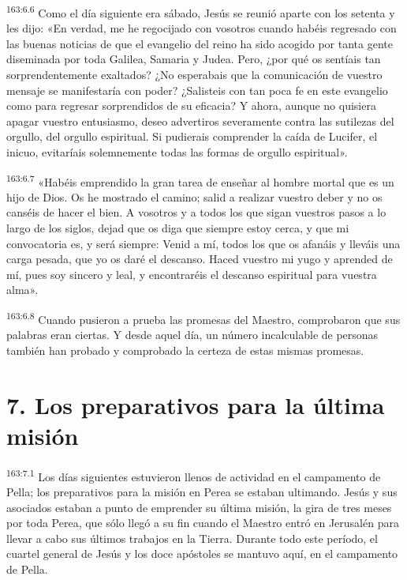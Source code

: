 \par 
\textsuperscript{163:6.6} Como el día siguiente era sábado, Jesús se reunió aparte con los setenta y les dijo: «En verdad, me he regocijado con vosotros cuando habéis regresado con las buenas noticias de que el evangelio del reino ha sido acogido por tanta gente diseminada por toda Galilea, Samaria y Judea. Pero, ¿por qué os sentíais tan sorprendentemente exaltados? ¿No esperabais que la comunicación de vuestro mensaje se manifestaría con poder? ¿Salisteis con tan poca fe en este evangelio como para regresar sorprendidos de su eficacia? Y ahora, aunque no quisiera apagar vuestro entusiasmo, deseo advertiros severamente contra las sutilezas del orgullo, del orgullo espiritual. Si pudierais comprender la caída de Lucifer, el inicuo, evitaríais solemnemente todas las formas de orgullo espiritual».

\par 
\textsuperscript{163:6.7} «Habéis emprendido la gran tarea de enseñar al hombre mortal que es un hijo de Dios. Os he mostrado el camino; salid a realizar vuestro deber y no os canséis de hacer el bien. A vosotros y a todos los que sigan vuestros pasos a lo largo de los siglos, dejad que os diga que siempre estoy cerca, y que mi convocatoria es, y será siempre: Venid a mí, todos los que os afanáis y lleváis una carga pesada, que yo os daré el descanso. Haced vuestro mi yugo y aprended de mí, pues soy sincero y leal, y encontraréis el descanso espiritual para vuestra alma».

\par 
\textsuperscript{163:6.8} Cuando pusieron a prueba las promesas del Maestro, comprobaron que sus palabras eran ciertas. Y desde aquel día, un número incalculable de personas también han probado y comprobado la certeza de estas mismas promesas.

\section*{7. Los preparativos para la última misión}
\par 
\textsuperscript{163:7.1} Los días siguientes estuvieron llenos de actividad en el campamento de Pella; los preparativos para la misión en Perea se estaban ultimando. Jesús y sus asociados estaban a punto de emprender su última misión, la gira de tres meses por toda Perea, que sólo llegó a su fin cuando el Maestro entró en Jerusalén para llevar a cabo sus últimos trabajos en la Tierra. Durante todo este período, el cuartel general de Jesús y los doce apóstoles se mantuvo aquí, en el campamento de Pella.

